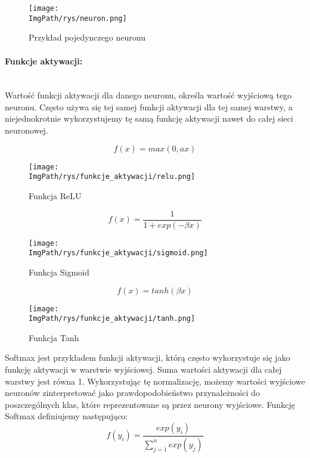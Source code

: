 \documentclass[a4paper,12pt,twoside,openany]{report}
\newcommand{\ImgPath}{.}
\begin{document}
\begin{figure}[H]	
	\centering
	\texttt{[image: \\ImgPath/rys/neuron.png]}
	
	\caption{Przykład pojedynczego neuronu}
\end{figure}

\paragraph{Funkcje aktywacji:}
\mbox{} \\ \indent
Wartość funkcji aktywacji dla danego neuronu, określa wartość wyjściową tego neuronu. Często używa się tej samej funkcji aktywacji dla tej samej warstwy, a niejednokrotnie wykorzystujemy tę samą funkcję aktywacji nawet do całej sieci neuronowej. 

\begin{equation}
  f(x) = max(0, ax) 
\end{equation}
\begin{figure}[H]	
	\centering
	\texttt{[image: \\ImgPath/rys/funkcje\_aktywacji/relu.png]}
	
	\caption{Funkcja ReLU}
\end{figure}

\begin{equation}
  f(x) = \frac{1}{1 + exp(-\beta x)} 
\end{equation}
\begin{figure}[H]	
	\centering
	\texttt{[image: \\ImgPath/rys/funkcje\_aktywacji/sigmoid.png]}
	
	\caption{Funkcja Sigmoid}
\end{figure}


\begin{equation}
	 f(x) = tanh(\beta x) 
\end{equation}
\begin{figure}[H]	
	\centering
	\texttt{[image: \\ImgPath/rys/funkcje\_aktywacji/tanh.png]}
	
	\caption{Funkcja Tanh}
\end{figure}

Softmax jest przykładem funkcji aktywacji, którą często wykorzystuje się jako funkcję aktywacji w warstwie wyjściowej. Suma wartości aktywacji dla całej warstwy jest równa 1. Wykorzystując tę normalizację, możemy wartości wyjściowe neuronów zinterpretować jako prawdopodobieństwo przynależności do poszczególnych klas, które reprezentowane są przez neurony wyjściowe. Funkcję Softmax definiujemy następująco: \\ 
\begin{equation}
    f(y_{i}) = \frac{exp(y_{i})}
		{\sum_{j=1}^{n} exp(y_{j})}
\end{equation}
\end{document}
